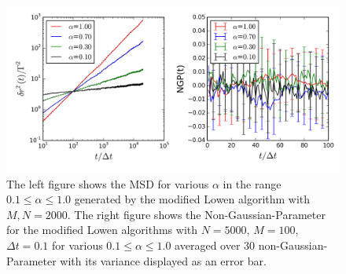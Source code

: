 \documentclass[
  a4paper,BCOR10mm,oneside,
  headsepline,footsepline,%
  fleqn,openbib
]{scrbook}
\begin{document}
\begin{figure}[h]
\centering
\includegraphics[width=\textwidth]{./data/nongaussianlowenalphaneumodifed.png}
\caption{The left figure shows the MSD for various $\alpha$ in the range $0.1\leq\alpha\leq1.0$ generated by the modified Lowen algorithm with $M,N=2000$.\newline
The right figure shows the  Non-Gaussian-Parameter for the modified Lowen algorithms with  $N=5000$, $M=100$, $\Delta t = 0.1$ for various $0.1\leq\alpha\leq1.0$ averaged over $30$ non-Gaussian-Parameter with its variance displayed as an error bar.}
\label{nongaussianlowenmodif}
\end{figure}
\end{document}
